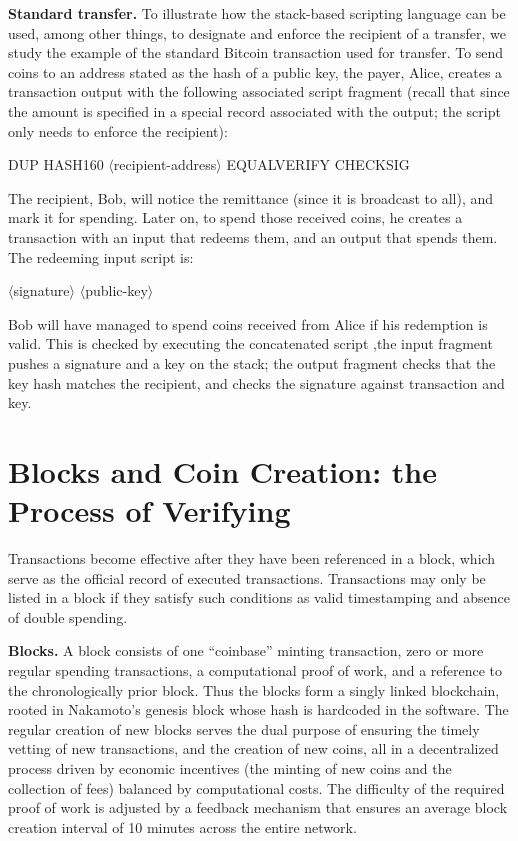 \textbf{Standard transfer.} To illustrate how the stack-based scripting language can be used,
among other things, to designate and enforce the recipient of a transfer, we study the example
of the standard Bitcoin transaction used for transfer. To send coins to an address
stated as the hash of a public key, the payer, Alice, creates a transaction output with
the following associated script fragment (recall that since the amount is specified in a
special record associated with the output; the script only needs to enforce the recipient):

DUP HASH160 $\langle$recipient-address$\rangle$  EQUALVERIFY CHECKSIG        

The recipient, Bob, will notice the remittance (since it is broadcast to all), and mark it
for spending. Later on, to spend those received coins, he creates a transaction with an
input that redeems them, and an output that spends them. The redeeming input script is:

$\langle$signature$\rangle$ $\langle$public-key$\rangle$ 

Bob will have managed to spend coins received from Alice if his redemption is valid.
This is checked by executing the concatenated script ,the input fragment  pushes a signature and a key on the stack; the output fragment  checks that the key
hash matches the recipient, and checks the signature against transaction and key.

\section{Blocks and Coin Creation: the Process of Verifying}
Transactions become effective after they have been referenced in a block, which serve as
the official record of executed transactions. Transactions may only be listed in a block
if they satisfy such conditions as valid timestamping and absence of double spending.

\textbf{Blocks.} A block consists of one “coinbase” minting transaction, zero or more regular
spending transactions, a computational proof of work, and a reference to the chronologically
prior block. Thus the blocks form a singly linked blockchain, rooted in Nakamoto’s
genesis block whose hash is hardcoded in the software. The regular creation of new
blocks serves the dual purpose of ensuring the timely vetting of new transactions, and
the creation of new coins, all in a decentralized process driven by economic incentives
(the minting of new coins and the collection of fees) balanced by computational costs.
The difficulty of the required proof of work is adjusted by a feedback mechanism that
ensures an average block creation interval of 10 minutes across the entire network.

